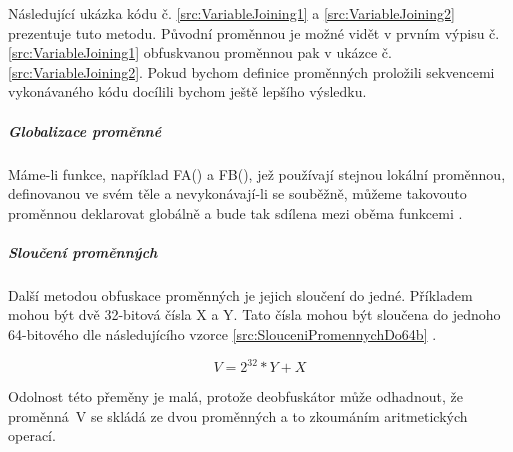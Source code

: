 Následující ukázka kódu č. \ref{src:VariableJoining1} a \ref{src:VariableJoining2} prezentuje tuto metodu. Původní proměnnou je možné vidět v prvním výpisu č. \ref{src:VariableJoining1} obfuskvanou proměnnou pak v ukázce č. \ref{src:VariableJoining2}. Pokud bychom definice proměnných proložili sekvencemi vykonávaného kódu docílili bychom ještě lepšího výsledku.


    \noindent
    \begin{minipage}[t]{1\textwidth}
        \noindent
        \centering
        
    \end{minipage}
    \newline
    \begin{minipage}[t]{1\textwidth}
        
    \end{minipage}


\subparagraph*{Globalizace proměnné}
Máme-li funkce, například FA() a FB(), jež používají stejnou lokální proměnnou, definovanou ve svém těle a nevykonávají-li se souběžně, můžeme takovouto proměnnou deklarovat globálně a bude tak sdílena mezi oběma funkcemi \cite{DataObfuscation}. 

\subparagraph*{Sloučení proměnných}

Další metodou obfuskace proměnných je jejich sloučení do jedné. Příkladem mohou být dvě 32-bitová čísla X a Y. Tato čísla mohou být sloučena do jednoho 64-bitového dle následujícího vzorce \ref{src:SlouceniPromennychDo64b} \cite{DataObfuscation}.

\begin{equation}
    \label{src:SlouceniPromennychDo64b}
    V = 2^{32} * Y + X
\end{equation}

Odolnost této přeměny je malá, protože deobfuskátor může odhadnout, že proměnná~V se skládá ze dvou proměnných a to zkoumáním aritmetických operací.


